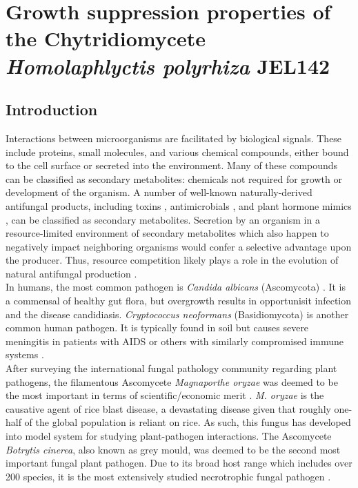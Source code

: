 ﻿%
\chapter{Growth suppression properties of the Chytridiomycete \textit{Homolaphlyctis polyrhiza} JEL142}
\label{chap:HpInhibition}
\section{Introduction}
Interactions between microorganisms are facilitated by biological signals. These include proteins, small molecules, and various chemical compounds, either bound to the cell surface or secreted into the environment. Many of these compounds can be classified as secondary metabolites: chemicals not required for growth or development of the organism. A number of well-known naturally-derived antifungal products, including toxins \cite{Kokkonen2010}, antimicrobials \cite{Wiemann2014}, and plant hormone mimics \cite{Howlett2006}, can be classified as secondary metabolites. Secretion by an organism in a resource-limited environment of secondary metabolites which also happen to negatively impact neighboring organisms would confer a selective advantage upon the producer. Thus, resource competition likely plays a role in the evolution of natural antifungal production \cite{Vicente2003}.\\
\indent In humans, the most common pathogen is \textit{Candida albicans} (Ascomycota) \cite{Sherris1994}. It is a commensal of healthy gut flora, but overgrowth results in opportunisit infection and the disease candidiasis. \textit{Cryptococcus neoformans} (Basidiomycota) is another common human pathogen. It is typically found in soil but causes severe meningitis in patients with AIDS or others with similarly compromised immune systems \cite{Casadevall2013}.\\
\indent After surveying the international fungal pathology community regarding plant pathogens, the filamentous Ascomycete \textit{Magnaporthe oryzae} was deemed to be the most important in terms of scientific/economic merit \cite{Dean2012}. \textit{M. oryzae} is the causative agent of rice blast disease, a devastating disease given that roughly one-half of the global population is reliant on rice. As such, this fungus has developed into model system for studying plant-pathogen interactions. The Ascomycete \textit{Botrytis cinerea}, also known as grey mould, was deemed to be the second most important fungal plant pathogen. Due to its broad host range which includes over 200 species, it is the most extensively studied necrotrophic fungal pathogen \cite{Dean2012}.\\
